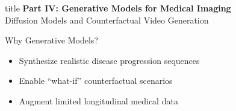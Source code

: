\documentclass[aspectratio=169]{beamer}
\begin{document}
\begin{frame}[plain]
    \centering
    \vfill
    \begin{beamercolorbox}[center,shadow=true,rounded=true]{title}
        \textbf{Part IV: Generative Models for Medical Imaging}\\
        \vspace{0.5em}
        \large Diffusion Models and Counterfactual Video Generation
    \end{beamercolorbox}
    \vfill
    
    \vspace{1em}
    \normalsize
    \begin{block}{Why Generative Models?}
        \begin{itemize}
            \item Synthesize realistic disease progression sequences
            \item Enable ``what-if'' counterfactual scenarios
            \item Augment limited longitudinal medical data
        \end{itemize}
    \end{block}
\end{frame}
\end{document}

